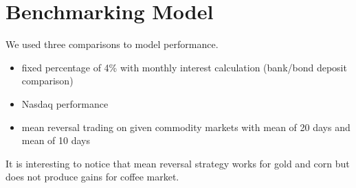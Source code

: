 \documentclass[final,2p]{elsarticle}
\begin{document}
\section{Benchmarking Model}

We used three comparisons to model performance.

\begin{itemize}
    \item fixed percentage of 4\% with monthly interest calculation (bank/bond deposit comparison)
    \item Nasdaq performance
    \item mean reversal trading on given commodity markets with mean of 20 days and mean of 10 days
\end{itemize}

It is interesting to notice that mean reversal strategy works for gold and corn but does not produce gains for coffee market.

\end{document}
